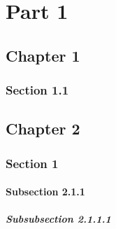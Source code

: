 \documentclass{book}
\begin{document}
\part{Part 1}
\label{part:part-1}

\setcounter{chapter}{12}

\chapter{Chapter 1}
\label{cha:chapter-1}


\section{Section 1.1}
\label{sec:section-1-1}

\chapter{Chapter 2}
\label{cha:chapter-2}

\section{Section 1}
\label{sec:section-2-1}

\subsection{Subsection 2.1.1}
\label{sec:subsection-2.1.1}

\subsubsection{Subsubsection 2.1.1.1}
\label{sec:subs-2.1.1.1}







\makeatletter
\show\cl@chapter
\makeatother
\end{document}
